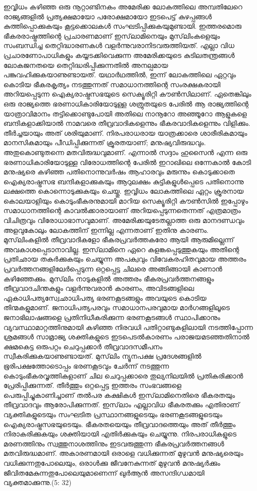 ഇവ്വിധം കഴിഞ്ഞ ഒരു നൂറ്റാണ്ടിനകം അമേരിക്ക ലോകത്തിലെ അമ്പതിലേറെ രാജ്യങ്ങളില്‍ പ്രത്യക്ഷമായോ പരോക്ഷമായോ ഇടപെട്ട് കുഴപ്പങ്ങള്‍ കുത്തിപ്പൊക്കുകയും കൂട്ടക്കൊലകള്‍ സംഘടിപ്പിക്കുകയുമുണ്ടായി. ഇത്തരമൊരു ഭീകരരാഷ്ട്രത്തിന്റെ പ്രചാരണമാണ് ഇസ്‌ലാമിനെയും മുസ്‌ലിംകളെയും സംബന്ധിച്ച തെറ്റിദ്ധാരണകള്‍ വളര്‍ന്നുവരാനിടവരുത്തിയത്. എല്ലാ വിധ പ്രചാരണോപാധികളും കയ്യടക്കിവെക്കുന്ന അമേരിക്കയുടെ കുടിലതന്ത്രങ്ങള്‍ ലോകജനതയെ തെറ്റിദ്ധരിപ്പിക്കുന്നതില്‍ അനല്പമായ പങ്കുവഹിക്കുകയാണുണ്ടായത്.
യഥാര്‍ഥത്തില്‍, ഇന്ന് ലോകത്തിലെ ഏറ്റവും കൊടിയ ഭീകരകൃത്യം നടത്തുന്നത് സമാധാനത്തിന്റെ സംരക്ഷകരായി അറിയപ്പെടുന്ന ഐക്യരാഷ്ട്രസഭയുടെ സെക്യൂരിറ്റി കൗണ്‍സിലാണ്. ഏതെങ്കിലും ഒരു രാജ്യത്തെ ഭരണാധികാരിയോടുള്ള ശത്രുതയുടെ പേരില്‍ ആ രാജ്യത്തിന്റെ യാത്രാവിമാനം തട്ടിക്കൊണ്ടുപോയി അതിലെ നാനൂറോ അഞ്ഞൂറോ ആളുകളെ ബന്ദികളാക്കിയാല്‍ നാമവരെ തീവ്രവാദികളെന്നും ഭീകരവാദികളെന്നും വിളിക്കും. തീര്‍ച്ചയായും അത് ശരിയുമാണ്. നിരപരാധരായ യാത്രക്കാരെ ശാരീരികമായും മാനസികമായും പീഡിപ്പിക്കുന്നത് ക്രൂരതയാണ്; മനുഷ്യവിരുദ്ധവും. അതുകൊണ്ടുതന്നെ മതവിരുദ്ധവുമാണ്. എന്നാല്‍ സദ്ദാം ഹുസൈന്‍ എന്ന ഒരു ഭരണാധികാരിയോടുള്ള വിരോധത്തിന്റെ പേരില്‍ ഇറാഖിലെ ഒന്നേകാല്‍ കോടി മനുഷ്യരെ കഴിഞ്ഞ പതിനൊന്നുവര്‍ഷം ആഹാരവും മരുന്നും കൊടുക്കാതെ ഐക്യരാഷ്ട്രസഭ ബന്ദികളാക്കുകയും ആറുലക്ഷം കുട്ടികളുള്‍പ്പെടെ പതിനൊന്നു ലക്ഷത്തെ കൊന്നൊടുക്കുകയും ചെയ്തു. ഇവ്വിധം ലോകത്തിലെ ഏറ്റം ക്രൂരനായ കൊലയാളിയും കൊടുംഭീകരനുമായി മാറിയ സെക്യൂരിറ്റി കൗണ്‍സില്‍ ഇപ്പോഴും സമാധാനത്തിന്റെ കാവല്‍ക്കാരായാണ് അറിയപ്പെടുന്നതെന്നത് എത്രമാത്രം വിചിത്രവും വിരോധാഭാസവുമാണ്. അമേരിക്കയുടേതല്ലാത്ത ഒരു മാനദണ്ഡവും അളവുകോലും ലോകത്തിന് ഇന്നില്ല എന്നതാണ് ഇതിനു കാരണം.
മുസ്‌ലിംകളില്‍ തീവ്രവാദികളോ ഭീകരപ്രവര്‍ത്തകരോ ആയി ആരുമില്ലെന്ന് അവകാശപ്പെടാനാവില്ല. ഇസ്‌ലാമിനെ ഏറെ കളങ്കപ്പെടുത്തുകയും അതിന്റെ പ്രതിഛായ തകര്‍ക്കുകയും ചെയ്യുന്ന അപക്വവും വിവേകരഹിതവുമായ അത്തരം പ്രവര്‍ത്തനങ്ങളിലേര്‍പ്പെടുന്ന ഒറ്റപ്പെട്ട ചിലരെ അങ്ങിങ്ങായി കാണാന്‍ കഴിഞ്ഞേക്കും. മുസ്‌ലിം നാടുകളില്‍ അത്തരം ഭീകരപ്രവര്‍ത്തനങ്ങളും തീവ്രവാദചിന്തകളും വളര്‍ന്നുവരാന്‍ കാരണം, അവിടങ്ങളിലെ ഏകാധിപത്യസ്വേഛാധിപത്യ ഭരണകൂടങ്ങളും അവയുടെ കൊടിയ തിന്മകളുമാണ്. ജനാധിപത്യപരവും സമാധാനപരവുമായ മാര്‍ഗങ്ങളിലൂടെ ജനാഭിലാഷങ്ങളെ പ്രതിനിധീകരിക്കുന്ന ഭരണകൂടങ്ങള്‍ സ്ഥാപിക്കാനും വ്യവസ്ഥാമാറ്റത്തിനുമായി കഴിഞ്ഞ നിരവധി പതിറ്റാണ്ടുകളിലായി നടത്തിപ്പോന്ന ശ്രമങ്ങള്‍ സാമ്രാജ്യ ശക്തികളുടെ ഇടപെടല്‍കാരണം പരാജയമടഞ്ഞതിനാല്‍ ക്ഷമകെട്ട ഒരുപറ്റം ചെറുപ്പക്കാര്‍ തീവ്രവാദസമീപനം സ്വീകരിക്കുകയാണുണ്ടായത്. മുസ്‌ലിം ന്യൂനപക്ഷ പ്രദേശങ്ങളില്‍ ഭൂരിപക്ഷത്തോടൊപ്പം ഭരണകൂടവും ചേര്‍ന്ന് നടത്തുന്ന കൊടുംഭീകരവൃത്തികളാണ് ചില ചെറുപ്പക്കാരെ തുല്യനിലയില്‍ പ്രതികരിക്കാന്‍ പ്രേരിപ്പിക്കുന്നത്. തീര്‍ത്തും ഒറ്റപ്പെട്ട ഇത്തരം സംഭവങ്ങളെ പെരുപ്പിച്ചുകാണിച്ചാണ് തല്‍പര കക്ഷികള്‍ ഇസ്‌ലാമിനെതിരെ ഭീകരതയും തീവ്രവാദവും ആരോപിക്കുന്നത്.
ഇസ്‌ലാം എല്ലാവിധ ഭീകരതക്കും എതിരാണ് വ്യക്തികളുടെയും സംഘടിത പ്രസ്ഥാനങ്ങളുടെയും ഭരണകൂടങ്ങളുടെയും ഐക്യരാഷ്ട്രസഭയുടെയും. ഭീകരതയെയും തീവ്രവാദത്തെയും അത് തീര്‍ത്തും നിരാകരിക്കുകയും ശക്തിയായി എതിര്‍ക്കുകയും ചെയ്യുന്നു. നിരപരാധികളുടെ മരണത്തിനും സ്വത്തുനാശത്തിനും ഇടവരുത്തുന്ന ഭീകരപ്രവര്‍ത്തനങ്ങള്‍ മതവിരുദ്ധമാണ്. അകാരണമായി ഒരാളെ വധിക്കുന്നത് മുഴുവന്‍ മനുഷ്യരെയും വധിക്കുന്നതുപോലെയും, ഒരാള്‍ക്കു ജീവനേകുന്നത് മുഴുവന്‍ മനുഷ്യര്‍ക്കും ജീവിതമേകുന്നതുപോലെയുമാണെന്ന് ഖുര്‍ആന്‍ അസന്ദിഗ്ധമായി വ്യക്തമാക്കുന്നു.(5: 32)
